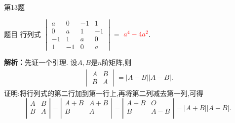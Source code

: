 \documentclass[aspectratio=169]{beamer}
\begin{document}
\begin{frame}{第13题}
\begin{block}{题目}
行列式 $\begin{vmatrix}
a & 0 & -1 & 1\\
0 & a & 1 & -1\\
-1 & 1 & a & 0\\
1 & -1 & 0 & a
\end{vmatrix}=$ \underline{\textcolor{red}{$a^4-4a^2$}}.
\end{block}
\textbf{解析：}先证一个引理.
设\(A,B\)是\(n\)阶矩阵,则
\begin{gather*}
\begin{vmatrix}
A & B\\
B & A
\end{vmatrix}=|A + B||A - B|.
\end{gather*}
证明:将行列式的第二行加到第一行上,再将第二列减去第一列,可得
\[
\left| \begin{matrix}
A&		B\\
B&		A\\
\end{matrix} \right|=\left| \begin{matrix}
A+B&		A+B\\
B&		A\\
\end{matrix} \right|=\left| \begin{matrix}
A+B&		O\\
B&		A-B\\
\end{matrix} \right|=|A + B||A - B|.
\]
\end{frame}
\end{document}
